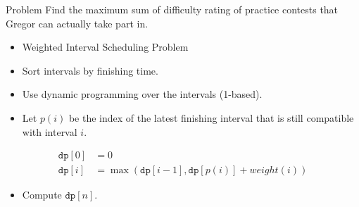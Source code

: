 \begin{slide}
    \begin{block}{Problem}
        Find the maximum sum of difficulty rating of practice contests that Gregor can actually take part in.
    \end{block}
\end{slide}

\begin{slide}

\begin{itemize}
  \item Weighted Interval Scheduling Problem
  \item Sort intervals by finishing time.
  \item Use dynamic programming over the intervals (1-based).
  \item Let $p(i)$ be the index of the latest finishing interval that is still compatible with interval $i$.
\end{itemize}
\begin{align*}
  \texttt{dp}[0] &= 0\\
  \texttt{dp}[i] &= \max(\texttt{dp}[i-1], \texttt{dp}[p(i)] + weight(i))
\end{align*}
\begin{itemize}
  \item Compute $\texttt{dp}[n]$.
\end{itemize}

\end{slide}